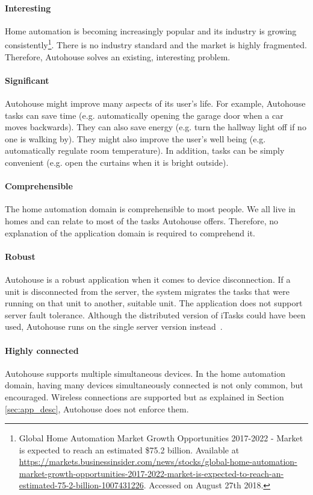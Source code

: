 \paragraph{Interesting} Home automation is becoming increasingly popular and its industry is growing consistently\footnote{Global Home Automation Market Growth Opportunities 2017-2022 - Market is expected to reach an estimated \$75.2 billion. Available at \url{https://markets.businessinsider.com/news/stocks/global-home-automation-market-growth-opportunities-2017-2022-market-is-expected-to-reach-an-estimated-75-2-billion-1007431226}. Accessed on August 27th 2018.}. There is no industry standard and the market is highly fragmented. Therefore, Autohouse solves an existing, interesting problem.

\paragraph{Significant} Autohouse might improve many aspects of its user's life. For example, Autohouse tasks can save time (e.g. automatically opening the garage door when a car moves backwards). They can also save energy (e.g. turn the hallway light off if no one is walking by). They might also improve the user's well being (e.g. automatically regulate room temperature). In addition, tasks can be simply convenient (e.g. open the curtains when it is bright outside).

\paragraph{Comprehensible} The home automation domain is comprehensible to most people. We all live in homes and can relate to most of the tasks Autohouse offers. Therefore, no explanation of the application domain is required to comprehend it. 

\paragraph{Robust} Autohouse is a robust application when it comes to device disconnection. If a unit is disconnected from the server, the system migrates the tasks that were running on that unit to another, suitable unit. The application does not support server fault tolerance. Although the distributed version of \gls{iTasks} could have been used, Autohouse runs on the single server version instead~\cite{distributed}.

\paragraph{Highly connected} Autohouse supports multiple simultaneous devices. In the home automation domain, having many devices simultaneously connected is not only common, but encouraged. Wireless connections are supported but as explained in Section \ref{sec:app_desc}, Autohouse does not enforce them. 

